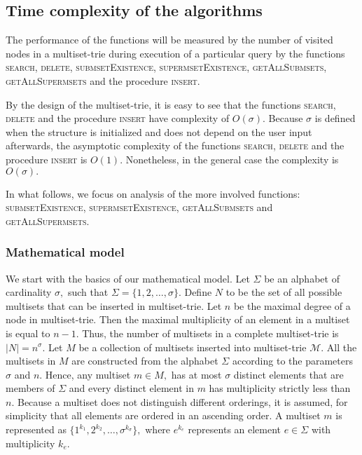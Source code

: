 \subsection{Time complexity of the algorithms}\label{s:timecomplexity}
The performance of the functions will be measured by the number of 
visited nodes in a multiset-trie during execution of a particular query by the 
functions \textsc{search}, \textsc{delete}, \textsc{submsetExistence}, 
\textsc{supermsetExistence}, \textsc{getAllSubmsets}, \textsc{getAllSupermsets} 
and the procedure \textsc{insert}.
%

By the design of the multiset-trie, it is easy to see that the functions \textsc{search},
\textsc{delete} and the procedure \textsc{insert} have complexity of $O(\sigma).$
Because $\sigma$ is defined when the structure is initialized and does not depend
on the user input afterwards, the asymptotic complexity of the functions \textsc{search}, 
\textsc{delete} and the procedure \textsc{insert} is $O(1).$ Nonetheless, in the general 
case the complexity is $O(\sigma).$

In what follows, we focus on analysis of the more involved functions:
\textsc{submsetExistence}, \textsc{supermsetExistence}, \textsc{getAllSubmsets}
and \textsc{getAllSupermsets}.

\subsubsection{Mathematical model} \label{ss:mathmodel}
We start with the basics of our mathematical model. Let $\Sigma$ be an alphabet of
cardinality $\sigma,$ such that $\Sigma = \{ 1,2, \ldots, \sigma \}.$ Define $N$
to be the set of all possible multisets that can be inserted in
multiset-trie. Let $n$ be the maximal degree of a node in multiset-trie.
Then the maximal multiplicity of an element in a multiset is equal to $n-1.$
Thus, the number of multisets in a complete multiset-trie is $ |N| = n^{\sigma}.$
%
Let $M$ be a collection of multisets inserted into multiset-trie $\mathcal{M}.$
All the multisets in $M$ are constructed from the alphabet $\Sigma$ according
to the parameters $\sigma$ and $n$. Hence, any multiset $m\in M,$ 
has at most $\sigma$ distinct elements that are members of $\Sigma$ and 
every distinct element in $m$ has multiplicity strictly less than $n.$
%
Because a multiset does not distinguish different orderings, it is assumed, for
simplicity that all elements are ordered in an ascending order. A multiset $m$ is
represented as $\{1^{k_1},2^{k_2},\ldots, \sigma^{k_\sigma}\},$ where $e^{k_e}$
represents an element $e\in\Sigma$ with multiplicity $k_e.$
%

